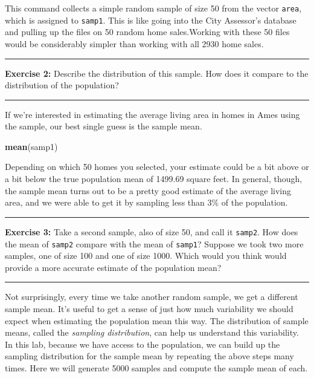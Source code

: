 \documentclass[]{book}
\newenvironment{Shaded}{\begin{snugshade}}{\end{snugshade}}
\newcommand{\KeywordTok}[1]{\textcolor[rgb]{0.13,0.29,0.53}{\textbf{{#1}}}}
\newcommand{\NormalTok}[1]{{#1}}
\theoremstyle{definition}
\theoremstyle{definition}
\theoremstyle{definition}
\theoremstyle{remark}
\begin{document}
This command collects a simple random sample of size 50 from the vector
\texttt{area}, which is assigned to \texttt{samp1}. This is like going
into the City Assessor's database and pulling up the files on 50 random
home sales.Working with these 50 files would be considerably simpler
than working with all 2930 home sales.

\begin{center}\rule{0.5\linewidth}{\linethickness}\end{center}

\textbf{Exercise 2:} Describe the distribution of this sample. How does
it compare to the distribution of the population?

\begin{center}\rule{0.5\linewidth}{\linethickness}\end{center}

If we're interested in estimating the average living area in homes in
Ames using the sample, our best single guess is the sample mean.

\begin{Shaded}
\begin{Highlighting}[]
\KeywordTok{mean}\NormalTok{(samp1)}
\end{Highlighting}
\end{Shaded}

Depending on which 50 homes you selected, your estimate could be a bit
above or a bit below the true population mean of 1499.69 square feet. In
general, though, the sample mean turns out to be a pretty good estimate
of the average living area, and we were able to get it by sampling less
than 3\% of the population.

\begin{center}\rule{0.5\linewidth}{\linethickness}\end{center}

\textbf{Exercise 3:} Take a second sample, also of size 50, and call it
\texttt{samp2}. How does the mean of \texttt{samp2} compare with the
mean of \texttt{samp1}? Suppose we took two more samples, one of size
100 and one of size 1000. Which would you think would provide a more
accurate estimate of the population mean?

\begin{center}\rule{0.5\linewidth}{\linethickness}\end{center}

Not surprisingly, every time we take another random sample, we get a
different sample mean. It's useful to get a sense of just how much
variability we should expect when estimating the population mean this
way. The distribution of sample means, called the \emph{sampling
distribution}, can help us understand this variability. In this lab,
because we have access to the population, we can build up the sampling
distribution for the sample mean by repeating the above steps many
times. Here we will generate 5000 samples and compute the sample mean of
each.
\end{document}
